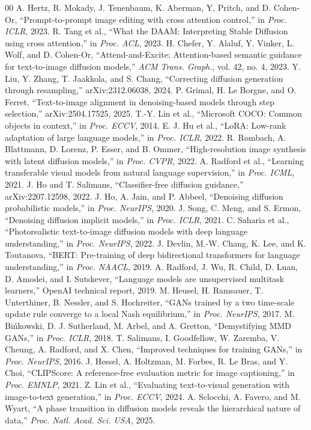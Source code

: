 \documentclass[conference]{IEEEtran}
\begin{document}
\begin{thebibliography}{00}\footnotesize
{} A. Hertz, R. Mokady, J. Tenenbaum, K. Aberman, Y. Pritch, and D. Cohen-Or, ``Prompt-to-prompt image editing with cross attention control,'' in \emph{Proc. ICLR}, 2023.
 R. Tang et al., ``What the DAAM: Interpreting Stable Diffusion using cross attention,'' in \emph{Proc. ACL}, 2023.
 H. Chefer, Y. Alaluf, Y. Vinker, L. Wolf, and D. Cohen-Or, ``Attend-and-Excite: Attention-based semantic guidance for text-to-image diffusion models,'' \emph{ACM Trans. Graph.}, vol. 42, no. 4, 2023.
 Y. Liu, Y. Zhang, T. Jaakkola, and S. Chang, ``Correcting diffusion generation through resampling,'' arXiv:2312.06038, 2024.
 P. Grimal, H. Le Borgne, and O. Ferret, ``Text-to-image alignment in denoising-based models through step selection,'' arXiv:2504.17525, 2025.
 T.-Y. Lin et al., ``Microsoft COCO: Common objects in context,'' in \emph{Proc. ECCV}, 2014.
 E. J. Hu et al., ``LoRA: Low-rank adaptation of large language models,'' in \emph{Proc. ICLR}, 2022.
 R. Rombach, A. Blattmann, D. Lorenz, P. Esser, and B. Ommer, ``High-resolution image synthesis with latent diffusion models,'' in \emph{Proc. CVPR}, 2022.
 A. Radford et al., ``Learning transferable visual models from natural language supervision,'' in \emph{Proc. ICML}, 2021.
 J. Ho and T. Salimans, ``Classifier-free diffusion guidance,'' arXiv:2207.12598, 2022.
 J. Ho, A. Jain, and P. Abbeel, ``Denoising diffusion probabilistic models,'' in \emph{Proc. NeurIPS}, 2020.
 J. Song, C. Meng, and S. Ermon, ``Denoising diffusion implicit models,'' in \emph{Proc. ICLR}, 2021.
 C. Saharia et al., ``Photorealistic text-to-image diffusion models with deep language understanding,'' in \emph{Proc. NeurIPS}, 2022.
 J. Devlin, M.-W. Chang, K. Lee, and K. Toutanova, ``BERT: Pre-training of deep bidirectional transformers for language understanding,'' in \emph{Proc. NAACL}, 2019.
 A. Radford, J. Wu, R. Child, D. Luan, D. Amodei, and I. Sutskever, ``Language models are unsupervised multitask learners,'' OpenAI technical report, 2019.
 M. Heusel, H. Ramsauer, T. Unterthiner, B. Nessler, and S. Hochreiter, ``GANs trained by a two time-scale update rule converge to a local Nash equilibrium,'' in \emph{Proc. NeurIPS}, 2017.
 M. Bi\'{n}kowski, D. J. Sutherland, M. Arbel, and A. Gretton, ``Demystifying MMD GANs,'' in \emph{Proc. ICLR}, 2018.
 T. Salimans, I. Goodfellow, W. Zaremba, V. Cheung, A. Radford, and X. Chen, ``Improved techniques for training GANs,'' in \emph{Proc. NeurIPS}, 2016.
 J. Hessel, A. Holtzman, M. Forbes, R. Le Bras, and Y. Choi, ``CLIPScore: A reference-free evaluation metric for image captioning,'' in \emph{Proc. EMNLP}, 2021.
 Z. Lin et al., ``Evaluating text-to-visual generation with image-to-text generation,'' in \emph{Proc. ECCV}, 2024.
 A. Sclocchi, A. Favero, and M. Wyart, ``A phase transition in diffusion models reveals the hierarchical nature of data,'' \emph{Proc. Natl. Acad. Sci. USA}, 2025.
\end{thebibliography}
\end{document}
